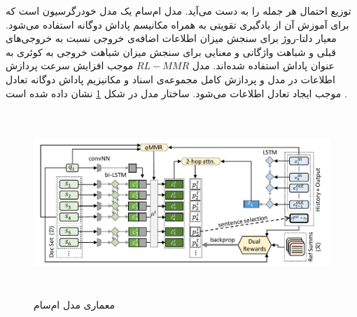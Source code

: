 توزیع احتمال هر جمله را به دست ‌می‌آید.
مدل ام‌سام
 یک مدل خودرگرسیون
است  که برای آموزش آن از یادگیری تقویتی به همراه مکانیسم پاداش دوگانه استفاده می‌شود.   معیار دلتا-روژ 
  برای سنجش میزان اطلاعات اضافه‌ی خروجی نسبت به خروجی‌های قبلی و شباهت واژگانی و معنایی  برای سنجش میزان شباهت خروجی به کوئری به عنوان پاداش استفاده شده‌اند.
    مدل $ RL-MMR $ ‌ موجب افزایش سرعت پردازش اطلاعات در مدل و پردازش کامل مجموعه‌ی اسناد و مکانیزیم پاداش دوگانه  تعادل موجب ایجاد تعادل اطلاعات می‌شود.    ساختار مدل در شکل  \ref{fig:MSumm}  نشان داده شده است
    \cite{shapira-etal-2022-interactive}.
  

    \begin{figure}[!h]
	\begin{center}
		\includegraphics[height=7cm]{query-assited.png}
	\end{center}
	\caption{ معماری مدل  ام‌سام \cite{shapira-etal-2022-interactive}} 
	\label{fig:MSumm}
	
	\medskip
	
\end{figure}






